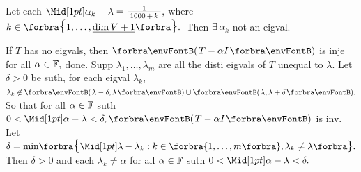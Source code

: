 \pagebreak

Let each $\aMid{\alpha_k-\lambda}=\frac{1}{\;1000\,+\,k\;},$ where $k\in\Bra{1,\dots,\uline{\dim V+1}}.$ \,Then $\exists\,\alpha_k$ not an eigval.\PfEnd
\SepLine[0pt][\Blind{\BulletPointX} ]

If $T$ has no eigvals, then $\Par{T-\alpha I}$ is inje for all $\alpha\in{\mathbb{F}},$ done.\parSol{}
Supp $\lambda_1,\dots,\lambda_m$ are all the disti eigvals of $T$ unequal to $\lambda.$\parSol{}
Let $\delta>0$ be suth, for each eigval $\lambda_k,$ $\lambda_k\not\in\Par{\lambda-\delta,\lambda}\cup \Par{\lambda,\lambda+\delta}.$\parSol{}
So that for all $\alpha\in{\mathbb{F}}$ suth $0<\aMid{\alpha-\lambda}<\delta,\Par{T-\alpha I}$ is inv.\PfEnd\vspace{4pt}\parSol{}
\Or Let $\delta=\min\!\Bra{\aMid{\lambda-\lambda_k}:k\in\envFontSmall\Bra{1,\dots,m}\envFontDefault,\lambda_k\neq\lambda}.$\parSol{}
Then $\delta>0$ and each $\lambda_k\neq\alpha$  for all $\alpha\in{\mathbb{F}}$ suth $0<\aMid{\alpha-\lambda}<\delta.$\PfEnd
\SepLine

